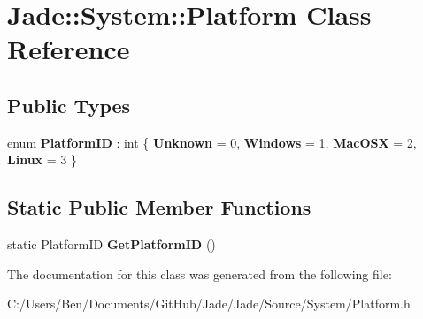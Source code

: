 \hypertarget{class_jade_1_1_system_1_1_platform}{}\section{Jade\+:\+:System\+:\+:Platform Class Reference}
\label{class_jade_1_1_system_1_1_platform}
\subsection*{Public Types}
\begin{DoxyCompactItemize}
\item 
\hypertarget{class_jade_1_1_system_1_1_platform_a863c143f8bd803f8d76bf31965681b4b}{}enum {\bfseries Platform\+I\+D} \+: int \{ {\bfseries Unknown} = 0, 
{\bfseries Windows} = 1, 
{\bfseries Mac\+O\+S\+X} = 2, 
{\bfseries Linux} = 3
 \}\label{class_jade_1_1_system_1_1_platform_a863c143f8bd803f8d76bf31965681b4b}

\end{DoxyCompactItemize}
\subsection*{Static Public Member Functions}
\begin{DoxyCompactItemize}
\item 
\hypertarget{class_jade_1_1_system_1_1_platform_adf4687dad2e5c57f03c52d95518f683a}{}static Platform\+I\+D {\bfseries Get\+Platform\+I\+D} ()\label{class_jade_1_1_system_1_1_platform_adf4687dad2e5c57f03c52d95518f683a}

\end{DoxyCompactItemize}


The documentation for this class was generated from the following file\+:\begin{DoxyCompactItemize}
\item 
C\+:/\+Users/\+Ben/\+Documents/\+Git\+Hub/\+Jade/\+Jade/\+Source/\+System/Platform.\+h\end{DoxyCompactItemize}
